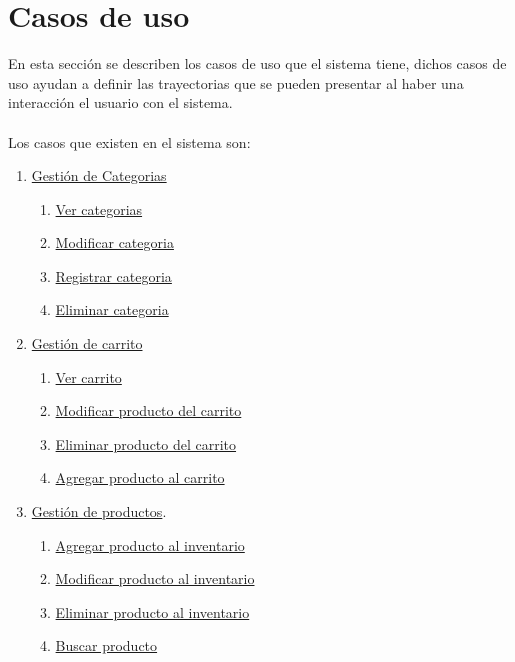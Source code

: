 \chapter{Casos de uso}

En esta sección se describen los casos de uso que el sistema tiene, dichos casos de uso ayudan a definir las trayectorias que se pueden presentar al haber una interacción el usuario con el sistema. \\ \\

Los casos que existen en el sistema son:

\begin{enumerate}
	\item \hyperlink{Gestion de Categorias}{Gesti\'on de Categorias}
		\begin{enumerate}
			\item \hyperlink{Ver categorias}{Ver categorias}
			\item \hyperlink{Modificar categoria}{Modificar categoria}
			\item \hyperlink{Registrar categoria}{Registrar categoria}
			\item \hyperlink{Eliminar categoria}{Eliminar categoria}
		\end{enumerate}
		\item \hyperlink{Gesti\'on de carrito}{Gesti\'on de carrito}
			\begin{enumerate}
				\item \hyperlink{Ver carrito}{Ver carrito}
				\item \hyperlink{Modificar producto del carrito}{Modificar producto del carrito}
				\item \hyperlink{Eliminar producto del carrito}{Eliminar producto del carrito}
				\item \hyperlink{Agregar producto al carrito}{Agregar producto al carrito}
			\end{enumerate}
			\item \hyperlink{Gesti\'on de productos}{Gesti\'on de productos}.
				\begin{enumerate}
					\item \hyperlink{Agregar producto al inventario}{Agregar producto al inventario}
					\item \hyperlink{Modificar producto al inventario}{Modificar producto al inventario}
					\item \hyperlink{Eliminar producto al inventario}{Eliminar producto al inventario}
					\item \hyperlink{Buscar producto}{Buscar producto}

\end{enumerate}
\end{enumerate}
